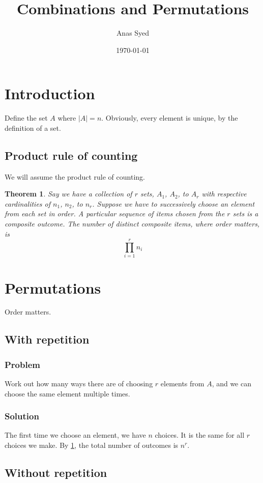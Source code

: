 \documentclass[a4paper,12pt]{article}
\title{Combinations and Permutations}
\date{\today}
\author{Anas Syed}
\newtheorem{theorem}{Theorem}
\begin{document}
\maketitle
\tableofcontents
\newpage
\section{Introduction}
Define the set $A$ where $|A|=n$. Obviously, every element is unique, by the definition of a set.

\subsection{Product rule of counting}
We will assume the product rule of counting.
\begin{theorem}
  Say we have a collection of $r$ sets, $A_1$, $A_2$, to $A_r$ with respective cardinalities of $n_1$, $n_2$, to $n_r$. Suppose we have to successively choose an element from each set in order. A particular sequence of items chosen from the $r$ sets is a \emph{composite outcome}. The number of distinct composite items, where order matters, is
  \begin{equation}
    \prod_{i=1}^r n_i
  \end{equation}
  \label{thm:productRule}
\end{theorem}

\section{Permutations}
Order matters.
\subsection{With repetition}
\label{subsec:permWithRep}
\subsubsection{Problem}
Work out how many ways there are of choosing $r$ elements from $A$, and we can choose the same element multiple times.

\subsubsection{Solution}
The first time we choose an element, we have $n$ choices. It is the same for all $r$ choices we make. By \cref{thm:productRule}, the total number of outcomes is $n^r$.

\subsection{Without repetition}
\end{document}
